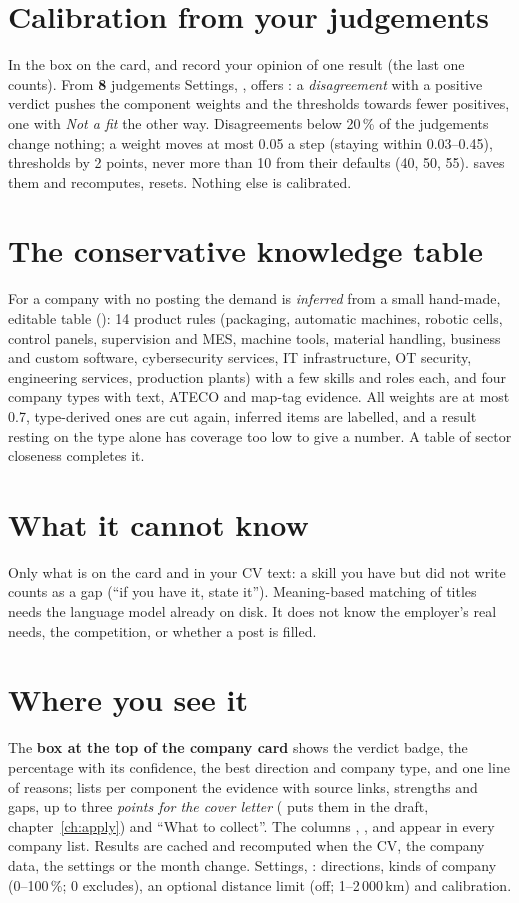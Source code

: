 \section{Calibration from your judgements}
In the box on the card,  and  record your opinion of one result (the last one
counts). From \textbf{8} judgements Settings, , offers :
a \emph{disagreement} with a positive verdict pushes the component weights and the thresholds towards
fewer positives, one with \emph{Not a fit} the other way. Disagreements below 20\,\% of the judgements
change nothing; a weight moves at most 0.05 a step (staying within 0.03--0.45), thresholds by 2 points, never more
than 10 from their defaults (40, 50, 55).  saves
them and recomputes,  resets. Nothing else is calibrated.

\section{The conservative knowledge table}\label{sec:knowledge}
For a company with no posting the demand is \emph{inferred} from a small hand-made, editable table
(): 14 product rules (packaging, automatic machines, robotic cells,
control panels, supervision and MES, machine tools, material handling, business and custom software,
cybersecurity services, IT infrastructure, OT security, engineering services, production plants)
with a few skills and roles each, and four company types with text, ATECO and map-tag evidence. All
weights are at most 0.7, type-derived ones are cut again, inferred items are labelled, and a result resting on the type
alone has coverage too low to give a number. A table of sector closeness completes it.

\section{What it cannot know}
Only what is on the card and in your CV text: a skill you have but did not write counts as a gap (``if you have
it, state it''). Meaning-based matching of titles needs the language model already on disk. It does not know the
employer's real needs, the competition, or whether a post is filled.

\section{Where you see it}
The \textbf{box at the top of the company card} shows the verdict badge, the percentage with its
confidence, the best direction and company type, and one line of reasons;  lists per component the evidence with source links, strengths and gaps, up to three \emph{points for
the cover letter} ( puts them in the draft, chapter~\ref{ch:apply}) and ``What to collect''. The columns , ,  and  appear in every company list. Results are cached and recomputed when the CV, the company data, the settings or the month
change. Settings, : directions, kinds of company (0--100\,\%; 0 excludes), an optional
distance limit (off; 1--2\,000\,km) and calibration.
